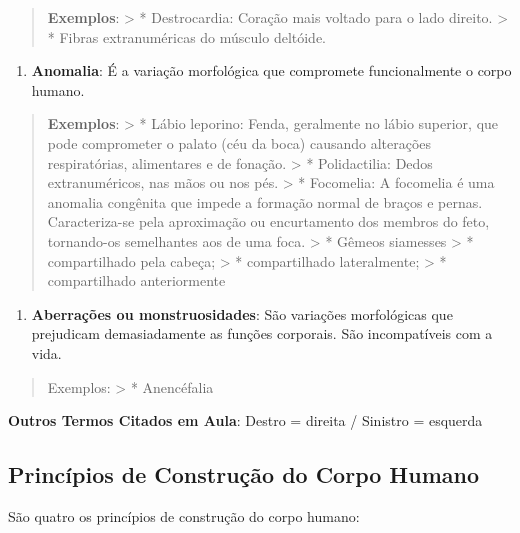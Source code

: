 \documentclass[
]{book}
\providecommand{\tightlist}{%
  \setlength{\itemsep}{0pt}\setlength{\parskip}{0pt}}
\begin{document}
\begin{quote}
\textbf{Exemplos}:
\textgreater{} * Destrocardia: Coração mais voltado para o lado direito.
\textgreater{} * Fibras extranuméricas do músculo deltóide.
\end{quote}

\begin{enumerate}
\def\labelenumi{\arabic{enumi}.}
\setcounter{enumi}{1}
\tightlist
\item
  \textbf{Anomalia}: É a variação morfológica que compromete funcionalmente o corpo humano.
\end{enumerate}

\begin{quote}
\textbf{Exemplos}:
\textgreater{} * Lábio leporino: Fenda, geralmente no lábio superior, que pode comprometer o palato (céu da boca) causando alterações respiratórias, alimentares e de fonação.
\textgreater{} * Polidactilia: Dedos extranuméricos, nas mãos ou nos pés.
\textgreater{} * Focomelia: A focomelia é uma anomalia congênita que impede a formação normal de braços e pernas. Caracteriza-se pela aproximação ou encurtamento dos membros do feto, tornando-os semelhantes aos de uma foca.
\textgreater{} * Gêmeos siamesses
\textgreater{} * compartilhado pela cabeça;
\textgreater{} * compartilhado lateralmente;
\textgreater{} * compartilhado anteriormente
\end{quote}

\begin{enumerate}
\def\labelenumi{\arabic{enumi}.}
\setcounter{enumi}{2}
\tightlist
\item
  \textbf{Aberrações ou monstruosidades}: São variações morfológicas que prejudicam demasiadamente as funções corporais. São incompatíveis com a vida.
\end{enumerate}

\begin{quote}
Exemplos:
\textgreater{} * Anencéfalia
\end{quote}

\textbf{Outros Termos Citados em Aula}: Destro = direita / Sinistro = esquerda

\hypertarget{princuxedpios-de-construuxe7uxe3o-do-corpo-humano}{%
\subsection{Princípios de Construção do Corpo Humano}\label{princuxedpios-de-construuxe7uxe3o-do-corpo-humano}}

São quatro os princípios de construção do corpo humano:
\end{document}
